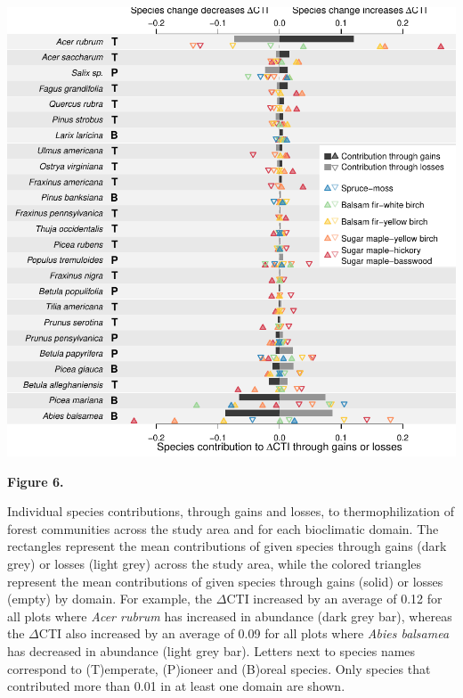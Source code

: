 \documentclass[a4paperpaper,]{article}
\begin{document}
\includegraphics[width=5.8in,height=\textheight]{ms/figures/fig6_spcontrib_cti.pdf}

\textbf{Figure 6.}

Individual species contributions, through gains and losses, to
thermophilization of forest communities across the study area and for
each bioclimatic domain. The rectangles represent the mean contributions
of given species through gains (dark grey) or losses (light grey) across
the study area, while the colored triangles represent the mean
contributions of given species through gains (solid) or losses (empty)
by domain. For example, the \(\Delta\)CTI increased by an average of
0.12 for all plots where \emph{Acer rubrum} has increased in abundance
(dark grey bar), whereas the \(\Delta\)CTI also increased by an average
of 0.09 for all plots where \emph{Abies balsamea} has decreased in
abundance (light grey bar). Letters next to species names correspond to
(T)emperate, (P)ioneer and (B)oreal species. Only species that
contributed more than 0.01 in at least one domain are shown.
\end{document}
